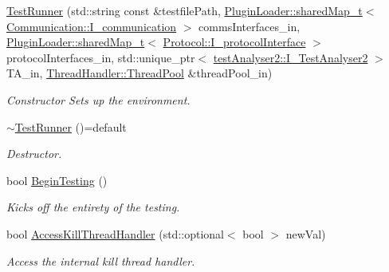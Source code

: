 \begin{DoxyCompactItemize}
\item 
\mbox{\hyperlink{classTestRunner_1_1TestRunner_a00b558f4bdc3553e357e992afafaf69d}{Test\+Runner}} (std\+::string const \&testfile\+Path, \mbox{\hyperlink{namespacePluginLoader_a8e505caea20d9f45155939545d29f6ba}{Plugin\+Loader\+::shared\+Map\+\_\+t}}$<$ \mbox{\hyperlink{classCommunication_1_1I__communication}{Communication\+::\+I\+\_\+communication}} $>$ comms\+Interfaces\+\_\+in, \mbox{\hyperlink{namespacePluginLoader_a8e505caea20d9f45155939545d29f6ba}{Plugin\+Loader\+::shared\+Map\+\_\+t}}$<$ \mbox{\hyperlink{classProtocol_1_1I__protocolInterface}{Protocol\+::\+I\+\_\+protocol\+Interface}} $>$ protocol\+Interfaces\+\_\+in, std\+::unique\+\_\+ptr$<$ \mbox{\hyperlink{classtestAnalyser2_1_1I__TestAnalyser2}{test\+Analyser2\+::\+I\+\_\+\+Test\+Analyser2}} $>$ T\+A\+\_\+in, \mbox{\hyperlink{classThreadHandler_1_1ThreadPool}{Thread\+Handler\+::\+Thread\+Pool}} \&thread\+Pool\+\_\+in)
\begin{DoxyCompactList}\small\item\em Constructor Sets up the environment. \end{DoxyCompactList}\item 
\mbox{\label{classTestRunner_1_1TestRunner_a06673bd35ba48548fb411efce5db0421}} 
\mbox{\hyperlink{classTestRunner_1_1TestRunner_a06673bd35ba48548fb411efce5db0421}{$\sim$\+Test\+Runner}} ()=default
\begin{DoxyCompactList}\small\item\em Destructor. \end{DoxyCompactList}\item 
bool \mbox{\hyperlink{classTestRunner_1_1TestRunner_a6d445a66f517e64d67f636d3bcab44c0}{Begin\+Testing}} ()
\begin{DoxyCompactList}\small\item\em Kicks off the entirety of the testing. \end{DoxyCompactList}\item 
bool \mbox{\hyperlink{classTestRunner_1_1TestRunner_aaf6f2a7fa3055ab8771ffa503906fcb1}{Access\+Kill\+Thread\+Handler}} (std\+::optional$<$ bool $>$ new\+Val)
\begin{DoxyCompactList}\small\item\em Access the internal kill thread handler. \end{DoxyCompactList}\end{DoxyCompactItemize}


